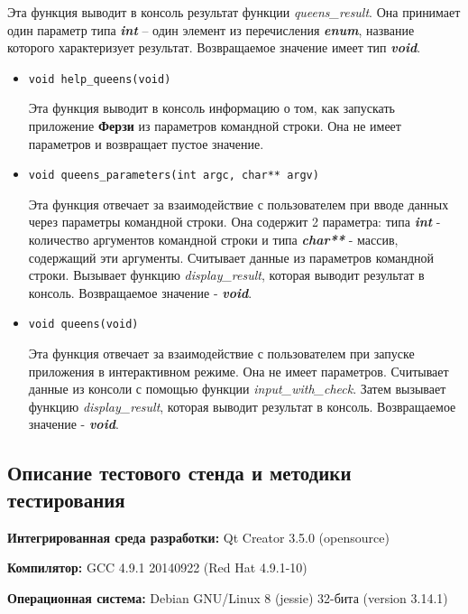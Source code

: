 \documentclass[12pt,a4paper]{report}
\begin{document}
\begin{enumerate}
\begin{itemize}
Эта функция выводит в консоль результат функции \textit{queens\_result}. Она принимает один параметр типа \textit{\textbf{int}} -- один элемент из перечисления \textit{\textbf{enum}}, название которого характеризует результат. Возвращаемое значение имеет тип \textit{\textbf{void}}.
\end{itemize}

\begin{itemize}
\item \verb-void help_queens(void)-

Эта функция выводит в консоль информацию о том, как запускать приложение \textbf{Ферзи} из параметров командной строки. Она не имеет параметров и возвращает пустое значение. 
\end{itemize}

\begin{itemize}
\item \verb-void queens_parameters(int argc, char** argv)-

Эта функция отвечает за взаимодействие с пользователем при вводе данных через параметры командной строки. Она содержит 2 параметра: типа \textbf{\textit{int}} - количество аргументов командной строки и типа \textbf{\textit{char**}} - массив, содержащий эти аргументы. Считывает данные из параметров командной строки. Вызывает функцию \textit{display\_result}, которая выводит результат в консоль. Возвращаемое значение - \textit{\textbf{void}}.
\end{itemize}

\begin{itemize}
\item \verb-void queens(void)-

Эта функция отвечает за взаимодействие с пользователем при запуске приложения в интерактивном режиме. Она не имеет параметров. Считывает данные из консоли с помощью функции \textit{input\_with\_check}. Затем вызывает функцию %
\textit{display\_result}, которая выводит результат в консоль. Возвращаемое значение - \textit{\textbf{void}}.
\end{itemize}
\end{enumerate}
\subsection{Описание тестового стенда и методики тестирования}

\begin{flushleft}
\textbf{Интегрированная среда разработки:} Qt Creator 3.5.0 (opensource)

\textbf{Компилятор:} GCC 4.9.1 20140922 (Red Hat 4.9.1-10)

\textbf{Операционная система:} Debian GNU/Linux 8 (jessie) 32-бита (version 3.14.1)
\end{flushleft}
\end{document}
